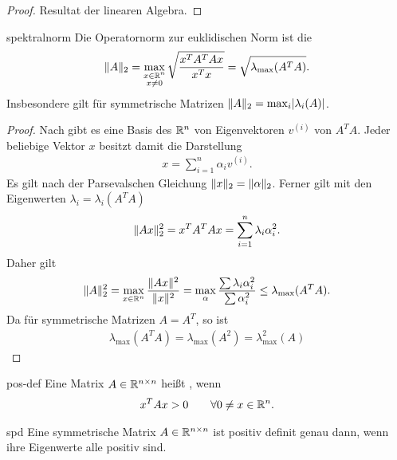 \begin{proof}
  Resultat der linearen Algebra.
\end{proof}

\begin{Satz}{spektralnorm}
  Die Operatornorm zur euklidischen Norm ist
  die 
  \begin{gather}
    \lVert A\rVert_2 = \max_{\substack{x\in\mathbb R^n\\x\neq0}}
    \sqrt{\frac{x^TA^TAx}{x^Tx}} = \sqrt{\lambda_{\max}(A^TA)}.
  \end{gather}
  Insbesondere gilt für symmetrische Matrizen
  $\lVert A\rVert_2 = \max_i\lvert\lambda_i(A)\rvert$.
\end{Satz}

\begin{proof}
  Nach  gibt es eine Basis des $\mathbb R^n$ von
  Eigenvektoren $v^{(i)}$ von $A^TA$. Jeder beliebige Vektor $x$
  besitzt damit die Darstellung
  \begin{gather}
    x = \sum_{i=1}^n \alpha_i v^{(i)}.
  \end{gather}
  Es gilt nach der Parsevalschen Gleichung
  $\lVert x\rVert_2 = \lVert\alpha\rVert_2$. Ferner gilt mit den Eigenwerten
  $\lambda_i = \lambda_i(A^TA)$
  \begin{gather}
    \lVert Ax\rVert_2^2 = x^TA^TAx = \sum_{i=1}^n \lambda_i \alpha_i^2.
  \end{gather}
  Daher gilt
  \begin{gather}
    \lVert A\rVert_2^2 = \max_{x\in \mathbb R^n} \frac{\lVert Ax\rVert^2}{\lVert x\rVert^2}
    = \max_{\alpha} \frac{\sum \lambda_i\alpha_i^2}{\sum\alpha_i^2}
    \le \lambda_{\max}(A^TA).
  \end{gather}
  Da für symmetrische Matrizen $A=A^T$, so ist
  \begin{gather}
    \lambda_{\max}(A^TA) = \lambda_{\max}(A^2) = \lambda_{\max}^2(A)
  \end{gather}
\end{proof}

\begin{Definition}{pos-def}
  Eine Matrix $A\in\mathbb R^{n\times n}$ heißt , wenn
  \begin{gather}
    x^TAx > 0 \qquad\forall 0\neq x\in \mathbb R^n.
  \end{gather}
\end{Definition}

\begin{Satz}{spd}
  Eine symmetrische Matrix $A\in\mathbb R^{n\times n}$ ist positiv definit
  genau dann, wenn ihre Eigenwerte alle positiv sind.
\end{Satz}

